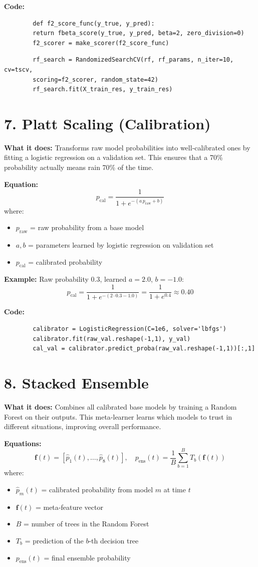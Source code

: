 \documentclass[12pt]{article}
\begin{document}
	\textbf{Code:}
	\begin{lstlisting}
		def f2_score_func(y_true, y_pred):
		return fbeta_score(y_true, y_pred, beta=2, zero_division=0)
		f2_scorer = make_scorer(f2_score_func)
	\end{lstlisting}
	\begin{lstlisting}
		rf_search = RandomizedSearchCV(rf, rf_params, n_iter=10, cv=tscv,
		scoring=f2_scorer, random_state=42)
		rf_search.fit(X_train_res, y_train_res)
	\end{lstlisting}
	
	\section*{7. Platt Scaling (Calibration)}
	\textbf{What it does:} Transforms raw model probabilities into well‑calibrated ones by fitting a logistic regression on a validation set. This ensures that a 70\% probability actually means rain 70\% of the time.
	
	\textbf{Equation:}
	\[
	p_{\text{cal}} = \frac{1}{1+e^{-(a\,p_{\text{raw}}+b)}}
	\]
	where:
	\begin{itemize}
		\item $p_{\text{raw}}$ = raw probability from a base model
		\item $a, b$ = parameters learned by logistic regression on validation set
		\item $p_{\text{cal}}$ = calibrated probability
	\end{itemize}
	
	\textbf{Example:} Raw probability 0.3, learned $a=2.0$, $b=-1.0$:
	\[
	p_{\text{cal}} = \frac{1}{1+e^{-(2\cdot0.3-1.0)}} = \frac{1}{1+e^{0.4}} \approx 0.40
	\]
	
	\textbf{Code:}
	\begin{lstlisting}
		calibrator = LogisticRegression(C=1e6, solver='lbfgs')
		calibrator.fit(raw_val.reshape(-1,1), y_val)
		cal_val = calibrator.predict_proba(raw_val.reshape(-1,1))[:,1]
	\end{lstlisting}
	
	\section*{8. Stacked Ensemble}
	\textbf{What it does:} Combines all calibrated base models by training a Random Forest on their outputs. This meta‑learner learns which models to trust in different situations, improving overall performance.
	
	\textbf{Equations:}
	\[
	\mathbf{f}(t) = [\hat{p}_1(t),\dots,\hat{p}_8(t)],\quad
	p_{\text{ens}}(t) = \frac{1}{B}\sum_{b=1}^{B} T_b(\mathbf{f}(t))
	\]
	where:
	\begin{itemize}
		\item $\hat{p}_m(t)$ = calibrated probability from model $m$ at time $t$
		\item $\mathbf{f}(t)$ = meta‑feature vector
		\item $B$ = number of trees in the Random Forest
		\item $T_b$ = prediction of the $b$-th decision tree
		\item $p_{\text{ens}}(t)$ = final ensemble probability
	\end{itemize}
	
\end{document}
